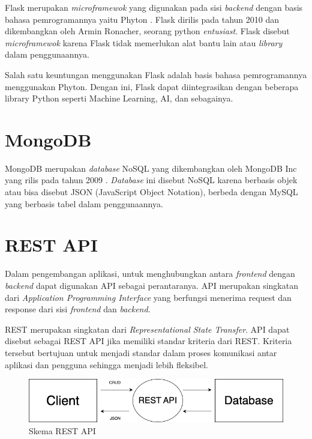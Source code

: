 \begin{spacing}{1.5}
Flask merupakan \textit{microframewok} yang digunakan pada sisi \textit{backend} dengan basis bahasa pemrogramannya yaitu Phyton \citep{flaskweb}. Flask dirilis pada tahun 2010 dan dikembangkan oleh Armin Ronacher, seorang python \textit{entusiast}. Flask disebut \textit{microframewok} karena Flask tidak memerlukan alat bantu lain atau \textit{library} dalam penggunaannya.

Salah satu keuntungan menggunakan Flask adalah basis bahasa pemrogramannya menggunakan Phyton. Dengan ini, Flask dapat diintegrasikan dengan beberapa library Python seperti Machine Learning, AI, dan sebagainya.

\section{MongoDB}

MongoDB merupakan \textit{database} NoSQL yang dikembangkan oleh MongoDB Inc yang rilis pada tahun 2009 \citep{mongodbweb}. \textit{Database} ini disebut NoSQL karena berbasis objek atau bisa disebut JSON (JavaScript Object Notation), berbeda dengan MySQL yang berbasis tabel dalam penggunaannya.

\section{REST API}

Dalam pengembangan aplikasi, untuk menghubungkan antara \textit{frontend} dengan \textit{backend} dapat digunakan API sebagai perantaranya. API merupakan singkatan dari \textit{Application Programming Interface} yang berfungsi menerima request dan response dari sisi \textit{frontend} dan \textit{backend}.

REST merupakan singkatan dari \textit{Representational State Transfer}. API dapat disebut sebagai REST API jika memiliki standar kriteria dari REST. Kriteria tersebut bertujuan untuk menjadi standar dalam proses komunikasi antar aplikasi dan pengguna sehingga menjadi lebih fleksibel.

\begin{figure}[H]
	\centering
	\includegraphics[width=1\textwidth]{gambar/restapi.png}
	\caption{Skema REST API}
\end{figure}


\end{spacing}
